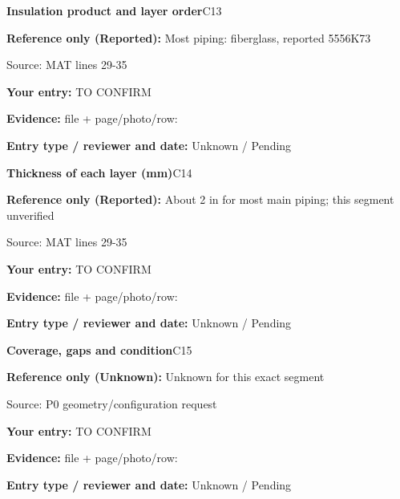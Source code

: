 \documentclass[11pt]{article}
\begin{document}
\par\noindent\begin{minipage}{\textwidth}\small
{\color{navy}\bfseries Insulation product and layer order}\hfill C13\par
\colorbox{pale}{\parbox{\dimexpr\linewidth-2\fboxsep\relax}{
\textbf{Reference only (Reported):} Most piping: fiberglass, reported 5556K73\par
{\footnotesize Source: MAT lines 29-35}}}\par
\textbf{Your entry:} {\color{muted}TO CONFIRM}\enspace\hrulefill\par
{\footnotesize\textbf{Evidence:} file + page/photo/row: \hrulefill\par
\textbf{Entry type / reviewer and date:} Unknown / Pending\par
}\end{minipage}\par\vspace{5pt}
\par\noindent\begin{minipage}{\textwidth}\small
{\color{navy}\bfseries Thickness of each layer (mm)}\hfill C14\par
\colorbox{pale}{\parbox{\dimexpr\linewidth-2\fboxsep\relax}{
\textbf{Reference only (Reported):} About 2 in for most main piping; this segment unverified\par
{\footnotesize Source: MAT lines 29-35}}}\par
\textbf{Your entry:} {\color{muted}TO CONFIRM}\enspace\hrulefill\par
{\footnotesize\textbf{Evidence:} file + page/photo/row: \hrulefill\par
\textbf{Entry type / reviewer and date:} Unknown / Pending\par
}\end{minipage}\par\vspace{5pt}
\par\noindent\begin{minipage}{\textwidth}\small
{\color{navy}\bfseries Coverage, gaps and condition}\hfill C15\par
\colorbox{pale}{\parbox{\dimexpr\linewidth-2\fboxsep\relax}{
\textbf{Reference only (Unknown):} Unknown for this exact segment\par
{\footnotesize Source: P0 geometry/configuration request}}}\par
\textbf{Your entry:} {\color{muted}TO CONFIRM}\enspace\hrulefill\par
{\footnotesize\textbf{Evidence:} file + page/photo/row: \hrulefill\par
\textbf{Entry type / reviewer and date:} Unknown / Pending\par
}\end{minipage}\par\vspace{5pt}
\end{document}
